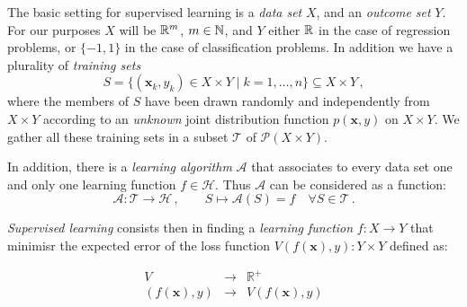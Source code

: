 %
%
%
%
%
%
%

The basic setting for supervised learning is a {\em data set\/} $X$, 
and an  {\em outcome set\/} $Y$.
For our purposes $X$ will be ${\mathbb R }^m$, $m\in{\mathbb N }$, and $Y$ either ${\mathbb R }$
in the case of regression problems, or $\{-1,1\}$ in the case of
classification problems.
In addition we have a plurality of {\em training sets\/}
$$
S=\bigg\{ (\mathbf{x}_k,y_k)\in X\times Y \mid k=1,\dots,n \bigg\}
\subseteq X\times Y\,,
$$
where the members of $S$ have been drawn randomly and independently
from $X\times Y$ according to an {\em unknown\/} joint distribution
function $p(\mathbf{x},y)$ on $X\times Y$.
We gather all these training sets in a subset $\mathscr{T}$ of
$\mathscr{P}(X\times Y)$.

In addition, there is a {\em learning algorithm\/} $\mathcal{A}$ that
associates to every data set one and only one learning function
$f\in\mathscr{H}$.
Thus $\mathcal{A}$ can be considered as a function:
$$
\mathcal{A}:\mathscr{T}\to\mathscr{H}\,,\qquad
S\mapsto\mathcal{A}(S)=f\quad\forall S\in\mathscr{T}\,.
$$ 

{\em Supervised learning\/} consists then in finding a {\em learning function\/}
$f:X\to Y$ that minimisr the expected error of the loss function $V(f(\mathbf{x}),y): Y
\times Y$ defined as:

\begin{eqnarray*}
\label{eq:lossfunction}
 V & \rightarrow & \mathbb{R}^+ \\
  (f(\mathbf{x}), y) &\rightarrow & V(f(\mathbf{x}),y)
\end{eqnarray*}

